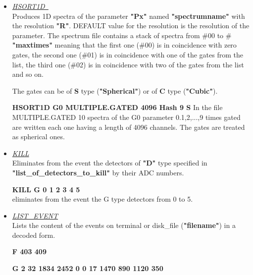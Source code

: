 \begin{itemize}
{	\hskip1cm     HK B0 F0 F1 0 2 10 2047 }\\
	The sum energy sum and multiplicity of the inner ball are reconstructed
	from the individual detector information and put in the HEADER 
	parameters F0 and F1, respectively. The sum energy is compressed by a
	factor 2 and cut between the channels 10 and 2047. The multiplicity
	spectrum is recorded on 128 channels.

 \item	{\it\underline{HSORT1D~}}\footnotemark[6] \\

	Produces 1D spectra of the parameter {\bf "Px"} named {\bf
	"spectrumname"} with the resolution {\bf "R"}. DEFAULT value for the
	resolution is the resolution of the parameter. 
	The spectrum file contains a stack of spectra from \#00 to \#{\bf
	"maxtimes"} meaning that the first one (\#00) is in coincidence with 
	zero gates, the second one (\#01) is in coincidence with one of the
	gates from the list, the third one (\#02) is in coincidence with two 
	of the gates from the list and so on.

	The gates can be of {\bf S} type ({\bf "Spherical"}) or of {\bf C} type
	({\bf "Cubic"}).

	\hskip1cm{\bf HSORT1D G0 MULTIPLE.GATED 4096 Hash 9 S}
	In the file MULTIPLE.GATED 10 spectra of the G0 parameter 0.1,2,...,9 
	times gated are
	written each one having a length of 4096 channels. The gates are
	treated as spherical ones.

 \item	{\it\underline{KILL}} \\

	Eliminates from the event the detectors of {\bf "D"} type  
	specified in {\bf "list\_of\_detectors\_to\_kill"} by their 
	ADC numbers. 
		
	\hskip1cm{\bf KILL G 0 1 2 3 4 5} \\
	eliminates from the event the G type detectors from 0 to 5.

 \item	{\it\underline{LIST\_EVENT}} \\

	Lists the content of the events on terminal or disk\_file 
	({\bf "filename"}) in a decoded form.

	\hskip1cm{\bf F 403  409} 

	\hskip1cm{\bf G  2  32 1834 2452    0    0   17 1470  890 1120  350 } 


\end{itemize}
